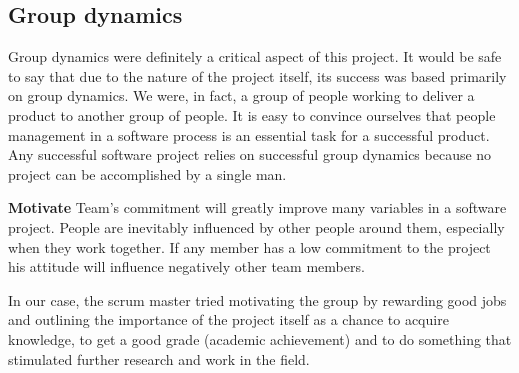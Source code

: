 \subsection{Group dynamics}
\label{sec:group}

Group dynamics were definitely a critical aspect of this project.
It would be safe to say that due to the nature of the project itself, its success was based primarily on group dynamics.
We were, in fact, a group of people working to deliver a product to another group of people.
It is easy to convince ourselves that people management in a software process is an essential task for a successful product.
Any successful software project relies on successful group dynamics because no project can be
accomplished by a single man.%

\textbf{Motivate}\newline
Team's commitment will greatly improve many variables in a software project.
People are inevitably influenced by other people around them, especially when they work together.
If any member has a low commitment to the project his attitude will influence negatively other team members.




In our case, the scrum master tried motivating the group by rewarding good jobs
and outlining the importance of the project itself as a chance to acquire knowledge,
to get a good grade (academic achievement) and to do something that stimulated further
research and work in the field.

